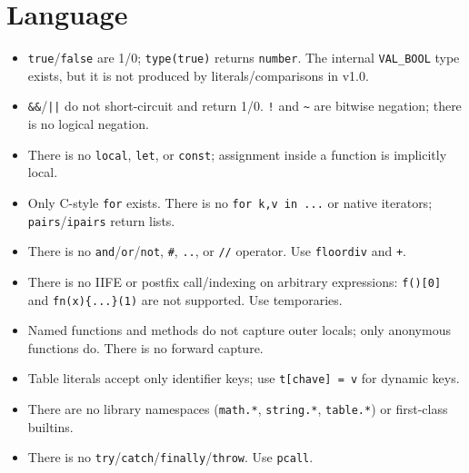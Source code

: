 \documentclass[11pt,a4paper,oneside]{report}
\newcommand{\code}[1]{\texttt{#1}}
\begin{document}
\section{Language}
\begin{itemize}
  \item \code{true}/\code{false} are 1/0; \code{type(true)} returns
        \code{number}. The internal \code{VAL\_BOOL} type exists, but it is
        not produced by literals/comparisons in v1.0.
  \item \code{\&\&}/\code{||} do not short-circuit and return 1/0.
        \code{!} and \code{\textasciitilde} are bitwise negation; there
        is no logical negation.
  \item There is no \code{local}, \code{let}, or \code{const};
        assignment inside a function is implicitly local.
  \item Only C-style \code{for} exists. There is no \code{for k,v in ...}
        or native iterators; \code{pairs}/\code{ipairs} return lists.
  \item There is no \code{and}/\code{or}/\code{not}, \code{\#},
        \code{..}, or \code{//} operator. Use \code{floordiv} and
        \code{+}.
  \item There is no IIFE or postfix call/indexing on arbitrary
        expressions: \code{f()[0]} and \code{fn(x)\{...\}(1)} are not
        supported. Use temporaries.
  \item Named functions and methods do not capture outer locals; only
        anonymous functions do. There is no forward capture.
  \item Table literals accept only identifier keys; use
        \code{t[chave] = v} for dynamic keys.
  \item There are no library namespaces (\code{math.*}, \code{string.*},
        \code{table.*}) or first-class builtins.
  \item There is no \code{try}/\code{catch}/\code{finally}/\code{throw}.
        Use \code{pcall}.
\end{itemize}
\end{document}
